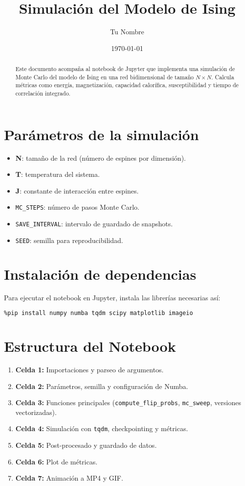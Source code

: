 \documentclass[a4paper,11pt]{article}
\title{Simulación del Modelo de Ising}
\author{Tu Nombre}
\date{\today}
\begin{document}
\maketitle

\begin{abstract}
Este documento acompaña al notebook de Jupyter que implementa una simulación de Monte Carlo del modelo de Ising en una red bidimensional de tamaño \(N \times N\). Calcula métricas como energía, magnetización, capacidad calorífica, susceptibilidad y tiempo de correlación integrado.
\end{abstract}

\section*{Parámetros de la simulación}
\begin{itemize}
  \item \textbf{N}: tamaño de la red (número de espines por dimensión).
  \item \textbf{T}: temperatura del sistema.
  \item \textbf{J}: constante de interacción entre espines.
  \item \texttt{MC\_STEPS}: número de pasos Monte Carlo.
  \item \texttt{SAVE\_INTERVAL}: intervalo de guardado de snapshots.
  \item \texttt{SEED}: semilla para reproducibilidad.
\end{itemize}

\section*{Instalación de dependencias}
Para ejecutar el notebook en Jupyter, instala las librerías necesarias así:
\begin{verbatim}
%pip install numpy numba tqdm scipy matplotlib imageio
\end{verbatim}

\section*{Estructura del Notebook}
\begin{enumerate}
  \item \textbf{Celda 1:} Importaciones y parseo de argumentos.
  \item \textbf{Celda 2:} Parámetros, semilla y configuración de Numba.
  \item \textbf{Celda 3:} Funciones principales (\texttt{compute\_flip\_probs}, \texttt{mc\_sweep}, versiones vectorizadas).
  \item \textbf{Celda 4:} Simulación con \texttt{tqdm}, checkpointing y métricas.
  \item \textbf{Celda 5:} Post-procesado y guardado de datos.
  \item \textbf{Celda 6:} Plot de métricas.
  \item \textbf{Celda 7:} Animación a MP4 y GIF.
\end{enumerate}
\end{document}
